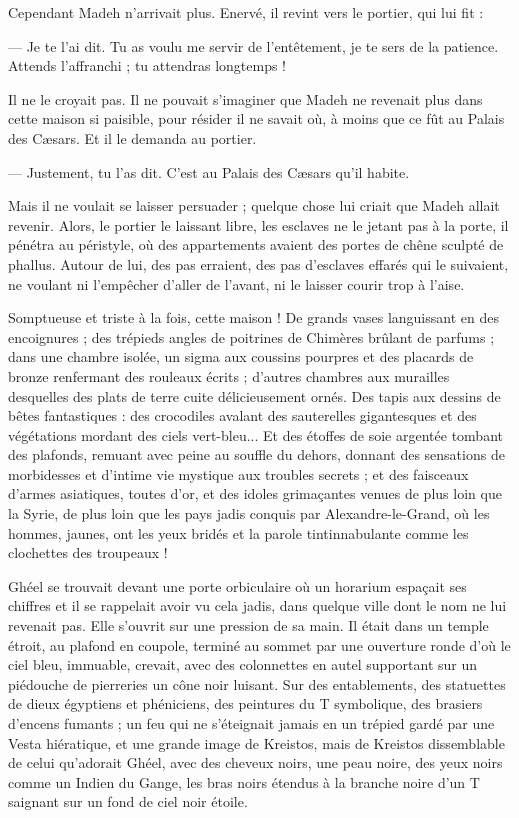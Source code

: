 \documentclass[a4paper, 11pt, oneside, polutonikogreek, french]{article}
\begin{document}
Cependant Madeh n'arrivait plus. Enervé, il revint vers le portier, qui lui fit :

--- Je te l'ai dit. Tu as voulu me servir de l'entêtement, je te sers de la patience. Attends l'affranchi ; tu attendras longtemps !

Il ne le croyait pas. Il ne pouvait s'imaginer que Madeh ne revenait plus dans cette maison si paisible, pour résider il ne savait où, à moins que ce fût au Palais des Cæsars. Et il le demanda au portier.

--- Justement, tu l'as dit. C'est au Palais des Cæsars qu'il habite.

Mais il ne voulait se laisser persuader ; quelque chose lui criait que Madeh allait revenir. Alors, le portier le laissant libre, les esclaves ne le jetant pas à la porte, il pénétra au péristyle, où des appartements avaient des portes de chêne sculpté de phallus. Autour de lui, des pas erraient, des pas d'esclaves effarés qui le suivaient, ne voulant ni l'empêcher d'aller de l'avant, ni le laisser courir trop à l'aise.

Somptueuse et triste à la fois, cette maison ! De grands vases languissant en des encoignures ; des trépieds angles de poitrines de Chimères brûlant de parfums ; dans une chambre isolée, un sigma aux coussins pourpres et des placards de bronze renfermant des rouleaux écrits ; d'autres chambres aux murailles desquelles des plats de terre cuite délicieusement ornés. Des tapis aux dessins de bêtes fantastiques : des crocodiles avalant des sauterelles gigantesques et des végétations mordant des ciels vert-bleu... Et des étoffes de soie argentée tombant des plafonds, remuant avec peine au souffle du dehors, donnant des sensations de morbidesses et d'intime vie mystique aux troubles secrets ; et des faisceaux d'armes asiatiques, toutes d'or, et des idoles grimaçantes venues de plus loin que la Syrie, de plus loin que les pays jadis conquis par Alexandre-le-Grand, où les hommes, jaunes, ont les yeux bridés et la parole tintinnabulante comme les clochettes des troupeaux !

Ghéel se trouvait devant une porte orbiculaire où un horarium espaçait ses chiffres et il se rappelait avoir vu cela jadis, dans quelque ville dont le nom ne lui revenait pas. Elle s'ouvrit sur une pression de sa main. Il était dans un temple étroit, au plafond en coupole, terminé au sommet par une ouverture ronde d'où le ciel bleu, immuable, crevait, avec des colonnettes en autel supportant sur un piédouche de pierreries un cône noir luisant. Sur des entablements, des statuettes de dieux égyptiens et phéniciens, des peintures du T symbolique, des brasiers d'encens fumants ; un feu qui ne s'éteignait jamais en un trépied gardé par une Vesta hiératique, et une grande image de Kreistos, mais de Kreistos dissemblable de celui qu'adorait Ghéel, avec des cheveux noirs, une peau noire, des yeux noirs comme un Indien du Gange, les bras noirs étendus à la branche noire d'un T saignant sur un fond de ciel noir étoile.
\end{document}
